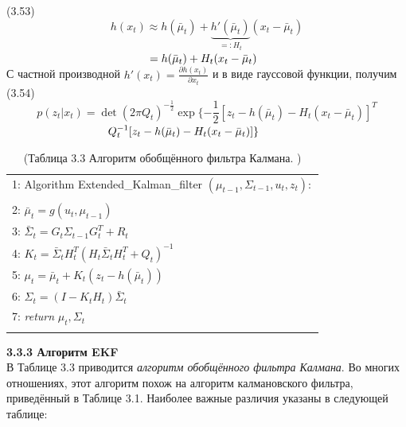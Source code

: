 \documentclass[10pt,a4paper]{article}
\begin{document}
(3.53)
$$h(x_t)\approx h(\bar{\mu}_t)+\underbrace{h'(\bar{\mu}_t)}_{=:H_t}(x_t-\bar{\mu}_t)$$
$\hspace{45mm}=h(\bar{\mu}_t)+H_t(x_t-\bar{\mu}_t)$\\

С частной производной $h'(x_t)=\frac{\partial h(x_t)}{\partial x_t}$ и в виде гауссовой функции, получим\\

(3.54)
$$p(z_t|x_t)=\det(2\pi Q_t)^{-\frac{1}{2}}\exp\{-\frac{1}{2}[z_t-h(\bar{\mu}_t)-H_t(x_t-\bar{\mu}_t)]^T$$
$\hspace{32mm}Q_t^{-1}[z_t-h(\bar{\mu}_t)-H_t(x_t-\bar{\mu}_t)]\}$\\


\begin{table}[H]
\begin{center}
\begin{tabular}{|l|}
\hline
1: \hspace{3mm} Algorithm Extended\_Kalman\_filter $(\mu_{t-1},\varSigma_{t-1},u_t,z_t):$ \\
{}\\
2: \hspace{7mm} 
$\bar{\mu}_t=g(u_t,\mu_{t-1})$\\
3: \hspace{7mm} $\bar{\varSigma}_t=G_t \varSigma_{t-1}G_t^T+R_t$\\
4: \hspace{7mm} $K_t=\bar{\varSigma}_t H_t^T(H_t\bar{\varSigma}_t H_t^T+Q_t)^{-1}$\\
5: \hspace{7mm} $\mu_t=\bar{\mu}_t+K_t(z_t-h(\bar{\mu}_t))$\\
6: \hspace{7mm}  $\varSigma_t=(I-K_t H_t)\bar{\varSigma}_t$\\
7: \hspace{7mm}
\textit{return} $\mu_t,\varSigma_t$\\
{}\\
\hline
\end{tabular}
\caption{(Таблица 3.3 Алгоритм обобщённого фильтра Калмана. )}
\end{center}
\end{table}

\textbf{3.3.3 Алгоритм EKF}\\
 
В Таблице 3.3 приводится \textit{алгоритм обобщённого фильтра Калмана}. Во многих отношениях, этот алгоритм похож на алгоритм калмановского фильтра, приведённый в Таблице 3.1. Наиболее важные различия указаны в следующей таблице:\\
\end{document}
